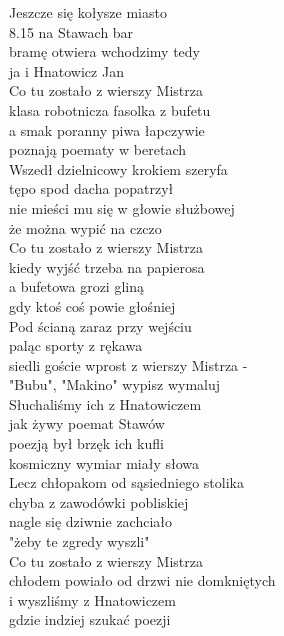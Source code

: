 
\begin{flushleft}
Jeszcze się kołysze miasto \\
8.15 na Stawach bar \\
bramę otwiera wchodzimy tedy \\
ja i Hnatowicz Jan \\
\vskip 3mm
Co tu zostało z wierszy Mistrza \\
klasa robotnicza fasolka z bufetu \\
a smak poranny piwa łapczywie \\
poznają poematy w beretach \\
\vskip 3mm
Wszedł dzielnicowy krokiem szeryfa \\
tępo spod dacha popatrzył \\
nie mieści mu się w głowie służbowej \\
że można wypić na czczo \\
\vskip 3mm
Co tu zostało z wierszy Mistrza \\
kiedy wyjść trzeba na papierosa \\
a bufetowa grozi gliną \\
gdy ktoś coś powie głośniej \\
\vskip 3mm
Pod ścianą zaraz przy wejściu \\
paląc sporty z rękawa \\
siedli goście wprost z wierszy Mistrza - \\
"Bubu", "Makino" wypisz wymaluj \\
\vskip 3mm
Słuchaliśmy ich z Hnatowiczem \\
jak żywy poemat Stawów \\
poezją był brzęk ich kufli \\
kosmiczny wymiar miały słowa \\
\vskip 3mm
Lecz chłopakom od sąsiedniego stolika \\
chyba z zawodówki pobliskiej \\
nagle się dziwnie zachciało \\
"żeby te zgredy wyszli" \\
\vskip 3mm
Co tu zostało z wierszy Mistrza \\
chłodem powiało od drzwi nie domkniętych \\
i wyszliśmy z Hnatowiczem  \\
gdzie indziej szukać poezji \\

\end{flushleft}
\clearpage

